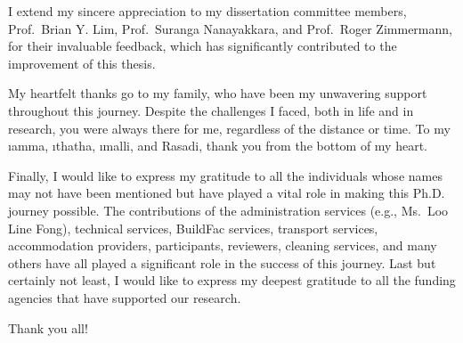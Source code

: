 \begin{acknowledgments}
I extend my sincere appreciation to my dissertation committee members, Prof.~Brian Y. Lim,  Prof.~Suranga Nanayakkara, and Prof.~Roger Zimmermann, for their invaluable feedback, which has significantly contributed to the improvement of this thesis.


My heartfelt thanks go to my family, who have been my unwavering support throughout this journey. Despite the challenges I faced, both in life and in research, you were always there for me, regardless of the distance or time. To my \i{amma}, \i{thatha}, \i{malli}, and Rasadi, thank you from the bottom of my heart.


Finally, I would like to express my gratitude to all the individuals whose names may not have been mentioned but have played a vital role in making this Ph.D. journey possible. The contributions of the administration services (e.g., Ms.~Loo Line Fong), technical services, BuildFac services, transport services, accommodation providers, participants, reviewers, cleaning services, and many others have all played a significant role in the success of this journey. Last but certainly not least, I would like to express my deepest gratitude to all the funding agencies that have supported our research. 

Thank you all!


\end{acknowledgments}
